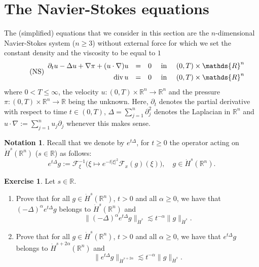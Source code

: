 \documentclass[a4paper, 12pt]{article}
\theoremstyle{plain}
\theoremstyle{definition}
\newtheorem{exercise}{Exercise}
\newtheorem{notation}[proposition]{Notation}
\theoremstyle{remark}
\numberwithin{equation}{section}
\begin{document}
\section{The Navier-Stokes equations}

The (simplified) equations that we consider in this section are the $n$-dimensional Navier-Stokes system ($n\ge 3$)
without external force for which we set the constant density and the viscosity to be equal to $1$
%
\begin{equation}
\label{eq:NS}\tag{NS}
\begin{array}{rclcl}
\partial_tu-\Delta u+\nabla\pi+(u\cdot\nabla)u&=&0&\mbox{ in }&(0,T)\times{\mathds{R}}^n
\\[4pt]
{\rm div}\,u&=&0&\mbox{ in }&(0,T)\times{\mathds{R}}^n
\end{array}
\end{equation}
%
where $0<T\le\infty$, the velocity 
$u:(0,T)\times{\mathds{R}}^n\to{\mathds{R}}^n$ and the pressure 
$\pi:(0,T)\times{\mathds{R}}^n\to{\mathds{R}}$ being the unknown. Here, $\partial_t$ denotes the 
partial derivative with respect to time $t\in(0,T)$, 
$\Delta=\sum_{j=1}^n\partial_j^2$ denotes the Laplacian in ${\mathds{R}}^n$ and 
$u\cdot\nabla:=\sum_{j=1}^n u_j\partial_j$ whenever this makes sense.

\begin{notation}
Recall that we denote by $e^{t\Delta}$, for $t\ge 0$ the operator acting on $\dot H^s({\mathds{R}}^n)$
($s\in{\mathds{R}}$) as follows:
\[
e^{t\Delta}g:={\mathscr{F}}_\xi^{-1}\bigl(\xi\mapsto e^{-t|\xi|^2}{\mathscr{F}}_x(g)(\xi)\bigr),\quad g\in\dot H^s({\mathds{R}}^n).
\]
\end{notation}

\begin{exercise}
\label{ex:heatanalytic}
Let $s\in{\mathds{R}}$.
%
\begin{enumerate}
\item
Prove that for all $g\in \dot H^s({\mathds{R}}^n)$, $t>0$ and all $\alpha\ge 0$, we have that $(-\Delta)^{\alpha}e^{t\Delta}g$ belongs
to $\dot H^s({\mathds{R}}^n)$ and 
\[
\bigl\|(-\Delta)^{\alpha}e^{t\Delta}g\bigr\|_{\dot H^s}\lesssim t^{-\alpha}\|g\|_{\dot H^s}.
\]
\item
Prove that for all $g\in \dot H^s({\mathds{R}}^n)$, $t>0$ and all $\alpha\ge 0$, we have that $e^{t\Delta}g$ belongs
to $\dot H^{s+2\alpha}({\mathds{R}}^n)$ and 
\[
\bigl\|e^{t\Delta}g\bigr\|_{\dot H^{s+2\alpha}}\lesssim t^{-\alpha}\|g\|_{\dot H^s}.
\]
\end{enumerate}
\end{exercise}
\end{document}
